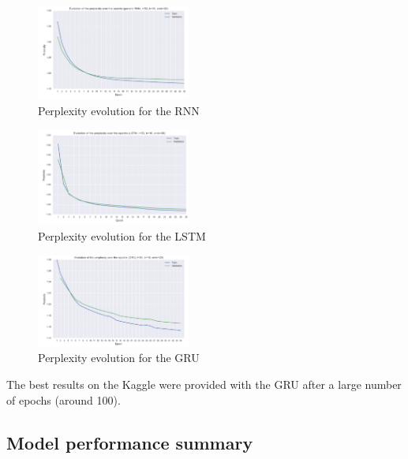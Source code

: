 \documentclass[11pt]{article}
\begin{document}
\begin{figure}[H]
\begin{center}
    \includegraphics[width=0.45\textwidth]{perp_rnn.png}
    \caption{Perplexity evolution for the RNN}
\end{center}
\end{figure}

\begin{figure}[H]
\begin{center}
    \includegraphics[width=0.45\textwidth]{perp_lstm.png}
    \caption{Perplexity evolution for the LSTM}
\end{center}
\end{figure}

\begin{figure}[H]
\begin{center}
    \includegraphics[width=0.45\textwidth]{perp_gru.png}
    \caption{Perplexity evolution for the GRU}
\end{center}
\end{figure}

The best results on the Kaggle were provided with the GRU after a large number of epochs (around 100).


\subsection{Model performance summary}
\end{document}
